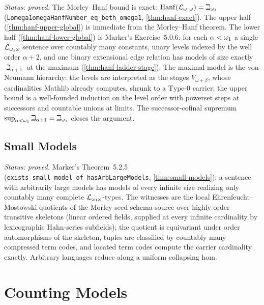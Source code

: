 \emph{Status: proved.}  The Morley--Hanf bound is exact:
$\mathrm{Hanf}(\mathcal{L}_{\omega_1\omega}) = \beth_{\omega_1}$
(\texttt{Lomega1omegaHanfNumber\_eq\_beth\_omega1}, \ref{thm:hanf-exact}).
The upper half (\ref{thm:hanf-upper-global}) is immediate from the Morley--Hanf
theorem.  The lower half (\ref{thm:hanf-lower-global}) is Marker's
Exercise~5.0.6: for each $\alpha < \omega_1$ a single $\mathcal{L}_{\omega_1\omega}$ sentence
over countably many constants, unary levels indexed by the well order
$\alpha+2$, and one binary extensional edge relation has models of size
exactly $\beth_{\alpha+1}$ at the maximum (\ref{thm:hanf-ladder-stage}).
The maximal model is the von Neumann hierarchy: the levels are interpreted as
the stages $V_{\omega+\beta}$, whose cardinalities Mathlib already computes,
shrunk to a $\mathrm{Type}$-$0$ carrier; the upper bound is a well-founded
induction on the level order with powerset steps at successors and countable
unions at limits.  The successor-cofinal supremum
$\sup_{\alpha<\omega_1}\beth_{\alpha+1} = \beth_{\omega_1}$ closes the
argument.





\section{Small Models}

\emph{Status: proved.}  Marker's Theorem~5.2.5~\cite{marker2016}
(\texttt{exists\_small\_model\_of\_hasArbLargeModels}, \ref{thm:small-models}): a sentence
with arbitrarily large models has models of every infinite size realizing only countably many
complete $\mathcal{L}_{\omega_1\omega}$-types.  The witnesses are the local Ehrenfeucht--Mostowski quotients of
the Morley-seed schema source over highly order-transitive skeletons (linear ordered fields,
supplied at every infinite cardinality by lexicographic Hahn-series subfields); the quotient is
equivariant under order automorphisms of the skeleton, tuples are classified by countably many
compressed term codes, and located term codes compute the carrier cardinality exactly.
Arbitrary languages reduce along a uniform collapsing hom.


\chapter{Counting Models}

